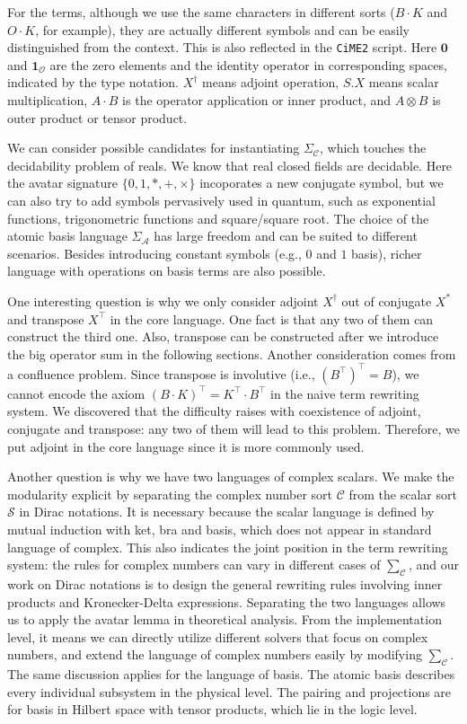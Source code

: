 \documentclass[manuscript, review, timestamp]{acmart}
\begin{document}
For the terms, although we use the same characters in different sorts ($B \cdot K$ and $O \cdot K$, for example), they are actually different symbols and can be easily distinguished from the context. This is also reflected in the \texttt{CiME2} script. Here $\mathbf{0}$ and $\mathbf{1}_\mathcal{O}$ are the zero elements and the identity operator in corresponding spaces, indicated by the type notation. $X^\dagger$ means adjoint operation, $S.X$ means scalar multiplication, $A \cdot B$ is the operator application or inner product, and $A \otimes B$ is outer product or tensor product.

We can consider possible candidates for instantiating $\Sigma_\mathcal{C}$, which touches the decidability problem of reals. We know that real closed fields are decidable\cite{Tarski1998}. Here the avatar signature $\{0, 1, *, +, \times\}$ incoporates a new conjugate symbol, but we can also try to add symbols pervasively used in quantum, such as exponential functions, trigonometric functions and square/square root.
The choice of the atomic basis language $\Sigma_\mathcal{A}$ has large freedom and can be suited to different scenarios. Besides introducing constant symbols (e.g., $0$ and $1$ basis), richer language with operations on basis terms are also possible. 

One interesting question is why we only consider adjoint $X^\dagger$ out of conjugate $X^*$ and transpose $X^\top$ in the core language. One fact is that any two of them can construct the third one. Also, transpose can be constructed after we introduce the big operator sum in the following sections. 
Another consideration comes from a confluence problem. Since transpose is involutive (i.e., $(B^\top)^\top = B$), we cannot encode the axiom $ (B \cdot K)^\top = K^\top \cdot B^\top$ in the naive term rewriting system. We discovered that the difficulty raises with coexistence of adjoint, conjugate and transpose: any two of them will lead to this problem. Therefore, we put adjoint in the core language since it is more commonly used.

Another question is why we have two languages of complex scalars.
We make the modularity explicit by separating the complex number sort $\mathcal{C}$ from the scalar sort $\mathcal{S}$ in Dirac notations. It is necessary because the scalar language is defined by mutual induction with ket, bra and basis, which does not appear in standard language of complex. This also indicates the joint position in the term rewriting system: the rules for complex numbers can vary in different cases of $\sum_\mathcal{C}$, and our work on Dirac notations is to design the general rewriting rules involving inner products and Kronecker-Delta expressions. Separating the two languages allows us to apply the avatar lemma in theoretical analysis. From the implementation level, it means we can directly utilize different solvers that focus on complex numbers, and extend the language of complex numbers easily by modifying $\sum_\mathcal{C}$.
The same discussion applies for the language of basis. The atomic basis describes every individual subsystem in the physical level. The pairing and projections are for basis in Hilbert space with tensor products, which lie in the logic level.
\end{document}
